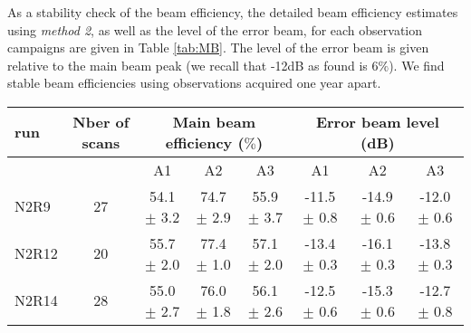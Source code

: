 As a stability check of the beam efficiency, the detailed beam
efficiency estimates using \emph{method 2}, as well as the level of
the error beam, for each observation campaigns are given in Table
\ref{tab:MB}. The level of the error beam is given relative to the
main beam peak (we recall that -12dB as found is $6\%$). We find
stable beam efficiencies using observations acquired one year apart.



\begin{table*}[!h]
\caption{Main beam efficiency and level of error beam}
\label{tab:MB}
\centering
\begin{tabular}{l| c | c c c | c c c}
\hline\hline
run  & Nber of scans & \multicolumn{3}{|c|}{Main beam efficiency ($\%$)} & \multicolumn{3}{c}{Error beam level (dB)} \\
\hline
     &               &  A1    &    A2   &  A3    & A1  &  A2  & A3   \\
            \hline
N2R9    & 27  &  54.1$\pm$ 3.2   &  74.7$\pm$ 2.9  & 55.9 $\pm$ 3.7   &  -11.5 $\pm$ 0.8    &  -14.9 $\pm$ 0.6   &  -12.0 $\pm$ 0.6   \\
N2R12   & 20  &  55.7$\pm$ 2.0   &  77.4$\pm$ 1.0  & 57.1 $\pm$ 2.0   &  -13.4 $\pm$ 0.3    &  -16.1 $\pm$ 0.3   &  -13.8 $\pm$ 0.3   \\
N2R14   & 28  &  55.0$\pm$ 2.7   &  76.0$\pm$ 1.8  & 56.1 $\pm$ 2.6   &  -12.5 $\pm$ 0.6    &  -15.3 $\pm$ 0.6   &  -12.7 $\pm$ 0.8   \\
            \hline\hline
\end{tabular}
\end{table*}

